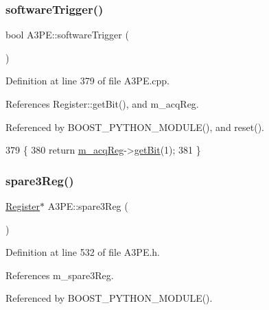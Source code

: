 \mbox{\label{classA3PE_acb2ccd6b78b39a0a9e360439b3b6f4c7}} 
\subsubsection{\texorpdfstring{software\+Trigger()}{softwareTrigger()}}
{\footnotesize\ttfamily bool A3\+P\+E\+::software\+Trigger (\begin{DoxyParamCaption}{ }\end{DoxyParamCaption})}



Definition at line 379 of file A3\+P\+E.\+cpp.



References Register\+::get\+Bit(), and m\+\_\+acq\+Reg.



Referenced by B\+O\+O\+S\+T\+\_\+\+P\+Y\+T\+H\+O\+N\+\_\+\+M\+O\+D\+U\+L\+E(), and reset().


\begin{DoxyCode}
379                           \{
380   \textcolor{keywordflow}{return} \hyperlink{classA3PE_abaf426f4c9192537117b77f9f4821e04}{m\_acqReg}->\hyperlink{classRegister_a5d27c9ff548817eee097ba4fdc8e8f69}{getBit}(1);
381 \}
\end{DoxyCode}
\mbox{\label{classA3PE_a979a9ac462eb55e611f6de4e94bad18e}} 
\subsubsection{\texorpdfstring{spare3\+Reg()}{spare3Reg()}}
{\footnotesize\ttfamily \hyperlink{classRegister}{Register}$\ast$ A3\+P\+E\+::spare3\+Reg (\begin{DoxyParamCaption}{ }\end{DoxyParamCaption})\hspace{0.3cm}{\ttfamily [inline]}}



Definition at line 532 of file A3\+P\+E.\+h.



References m\+\_\+spare3\+Reg.



Referenced by B\+O\+O\+S\+T\+\_\+\+P\+Y\+T\+H\+O\+N\+\_\+\+M\+O\+D\+U\+L\+E().


